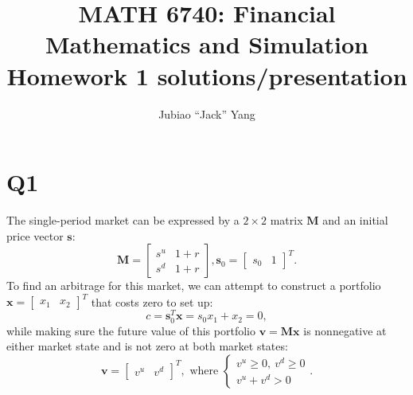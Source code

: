 \documentclass[final,3p,times]{elsarticle}
\begin{document}
\begin{frontmatter}

\title{MATH 6740: Financial Mathematics and Simulation\\
	Homework 1 solutions/presentation}

\author[rvt]{Jubiao ``Jack'' Yang}

\address[rvt]{Rensselaer Polytechnic Institute, Troy, NY 12180}


\end{frontmatter}

\section{Q1}
	The single-period market can be expressed by a $2\times2$ matrix $\mathbf{M}$ and an initial price vector $\mathbf{s}$:
	\begin{subequations}
		\label{EqnDefinitionMs0}
		\begin{equation}
			\mathbf{M}=
				\begin{bmatrix}
					s^u & 1+r \\
					s^d & 1+r
				\end{bmatrix}
			,
		\end{equation}
		\begin{equation}
			\mathbf{s}_0=
				\begin{bmatrix}
					s_0 & 1
				\end{bmatrix}^T
			.
		\end{equation}
	\end{subequations}
	To find an arbitrage for this market, we can attempt to construct a portfolio $\mathbf{x}=\begin{bmatrix} x_1 & x_2 \end{bmatrix}^T$ that costs zero to set up:
	\begin{equation}
		\label{EqnCostZero2x2}
		c=\mathbf{s}_0^T \mathbf{x}= s_0 x_1 + x_2 = 0
		,
	\end{equation}
	while making sure the future value of this portfolio $\mathbf{v}=\mathbf{Mx}$ is nonnegative at either market state and is not zero at both market states:
	\begin{equation}
		\label{EqnPositivePortfolioValue2x2}
		\mathbf{v}=
			\begin{bmatrix}
				v^u & v^d
			\end{bmatrix}^T,\text{ where }
			\begin{cases}
				v^u \geq 0,~v^d \geq 0 \\
				v^u+v^d>0
			\end{cases}
		.
	\end{equation}
	
\end{document}
